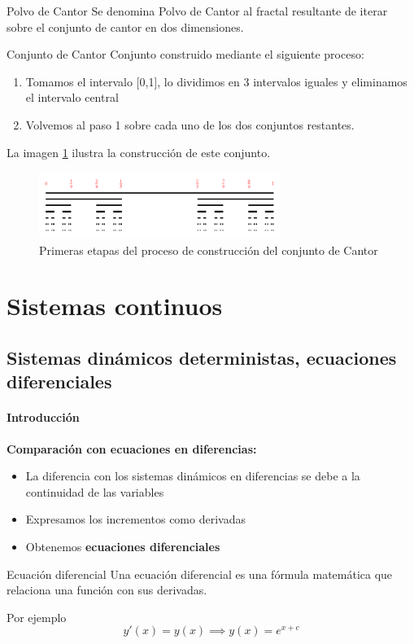 \documentclass[8pt]{beamer}
\begin{document}
\begin{frame}
\begin{block}{Polvo de Cantor}
Se denomina Polvo de Cantor al fractal resultante de iterar sobre el conjunto de cantor en dos dimensiones.
\end{block}

\begin{block}{Conjunto de Cantor}
Conjunto construido mediante el siguiente proceso:

\begin{enumerate}
\item Tomamos el intervalo [0,1], lo dividimos en 3 intervalos iguales y eliminamos el intervalo central

\item Volvemos al paso 1 sobre cada uno de los dos conjuntos restantes.
\end{enumerate}

La imagen \ref{fig:conjuntoCantor} ilustra la construcción de este conjunto.
\end{block}

\begin{figure}[hbtp]
\centering
\includegraphics[width = 0.7\textwidth]{img/conjuntoCantor.png}
\caption{Primeras etapas del proceso de construcción del conjunto de Cantor}
\label{fig:conjuntoCantor}
\end{figure}

\end{frame}

\section{Sistemas continuos}
\subsection{Sistemas dinámicos deterministas, ecuaciones diferenciales}
\begin{frame}
\framesubtitle{Introducción}

\textbf{Comparación con ecuaciones en diferencias:}
\begin{itemize}
\item La diferencia con los sistemas dinámicos en diferencias se debe a la continuidad de las variables
\item Expresamos los incrementos como derivadas
\item Obtenemos \textbf{ecuaciones diferenciales}
\end{itemize}

\begin{block}{Ecuación diferencial}
Una ecuación diferencial es una fórmula matemática que relaciona una función con sus derivadas.

Por ejemplo
\[y'(x) = y(x) \implies y(x) = e^{x+c}\]
\end{block}
\end{frame}
\end{document}
